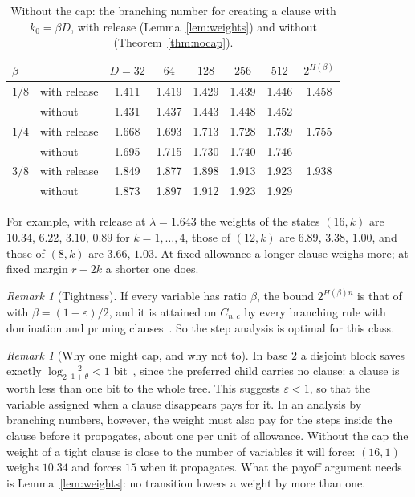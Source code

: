 \documentclass[11pt,a4paper]{article}
\theoremstyle{remark}
\newtheorem{remark}[theorem]{Remark}
\begin{document}
\begin{table}[ht]
\centering
\begin{tabular}{llcccccc}
\toprule
$\beta$ & & $D=32$ & $64$ & $128$ & $256$ & $512$ & $2^{H(\beta)}$\\
\midrule
$1/8$ & with release & 1.411 & 1.419 & 1.429 & 1.439 & 1.446 & 1.458\\
 & without & 1.431 & 1.437 & 1.443 & 1.448 & 1.452 & \\
$1/4$ & with release & 1.668 & 1.693 & 1.713 & 1.728 & 1.739 & 1.755\\
 & without & 1.695 & 1.715 & 1.730 & 1.740 & 1.746 & \\
$3/8$ & with release & 1.849 & 1.877 & 1.898 & 1.913 & 1.923 & 1.938\\
 & without & 1.873 & 1.897 & 1.912 & 1.923 & 1.929 & \\
\bottomrule
\end{tabular}
\caption{Without the cap: the branching number for creating a clause with
$k_0=\beta D$, with release (Lemma~\ref{lem:weights}) and without
(Theorem~\ref{thm:nocap}).}\label{tab:nocap}
\end{table}

For example, with release at $\lambda=1.643$ the weights of the states $(16,k)$ are
$10.34$, $6.22$, $3.10$, $0.89$ for $k=1,\dots,4$, those of $(12,k)$ are
$6.89$, $3.38$, $1.00$, and those of $(8,k)$ are $3.66$, $1.03$. At fixed
allowance a longer clause weighs more; at fixed margin $r-2k$ a shorter one
does.

\begin{remark}[Tightness]\label{rem:tight}
If every variable has ratio $\beta$, the bound $2^{H(\beta)n}$ is that
of~\cite[Theorem~11]{N3} with $\beta=(1-\varepsilon)/2$, and it is attained on
$C_{n,c}$ by every branching rule with domination and pruning
clauses~\cite[Theorem~13, Observation~22]{N3}. So the step analysis is optimal
for this class.
\end{remark}

\begin{remark}[Why one might cap, and why not to]\label{rem:onebit}
In base $2$ a disjoint block saves exactly $\log_2\frac2{1+\theta}<1$
bit~\cite[Proposition~25]{N3}, since the preferred child carries no clause: a
clause is worth less than one bit to the whole tree. This suggests $\varepsilon<1$,
so that the variable assigned when a clause disappears pays for it. In an
analysis by branching numbers, however, the weight must also pay for the steps
inside the clause before it propagates, about one per unit of allowance. Without
the cap the weight of a tight clause is close to the number of variables it will
force: $(16,1)$ weighs $10.34$ and forces $15$ when it propagates. What the
payoff argument needs is Lemma~\ref{lem:weights}: no transition lowers a weight
by more than one.
\end{remark}
\end{document}
